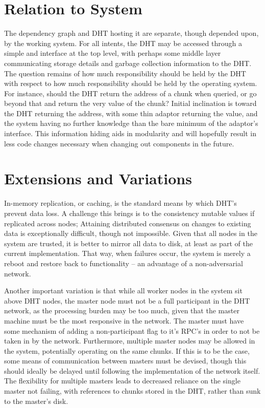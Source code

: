\documentclass[10pt, a4paper]{article}
\begin{document}
\section{Relation to System}

The dependency graph and DHT hosting it are separate, though depended upon, by the working \lsr{} system.
For all intents, the DHT may be accessed through a simple  and  interface at the top level, with perhaps some middle layer communicating storage details and garbage collection information to the DHT.
The question remains of how much responsibility should be held by the DHT with respect to how much responsibility should be held by the operating \lsr{} system.
For instance, should the DHT return the address of a chunk when queried, or go beyond that and return the very value of the chunk?
Initial inclination is toward the DHT returning the address, with some thin adaptor returning the value, and the system having no further knowledge than the bare minimum of the adaptor's interface.
This information hiding aids in modularity and will hopefully result in less code changes necessary when changing out components in the future.

\section{Extensions and Variations}

In-memory replication, or caching, is the standard means by which DHT's prevent data loss.
A challenge this brings is to the consistency mutable values if replicated across nodes;
Attaining distributed consensus on changes to existing data is exceptionally difficult, though not impossible.
Given that all nodes in the system are trusted, it is better to mirror all data to disk, at least as part of the current implementation.
That way, when failures occur, the system is merely a reboot and restore back to functionality -- an advantage of a non-adversarial network.

Another important variation is that while all worker nodes in the system sit above DHT nodes, the master node must not be a full participant in the DHT network, as the processing burden may be too much, given that the master machine must be the most responsive in the network.
The master must have some mechanism of adding a non-participant flag to it's RPC's in order to not be taken in by the network.
Furthermore, multiple master nodes may be allowed in the system, potentially operating on the same chunks.
If this is to be the case, some means of communication between masters must be devised, though this should ideally be delayed until following the implementation of the network itself.
The flexibility for multiple masters leads to decreased reliance on the single master not failing, with references to chunks stored in the DHT, rather than sunk to the master's disk.

\end{document}
